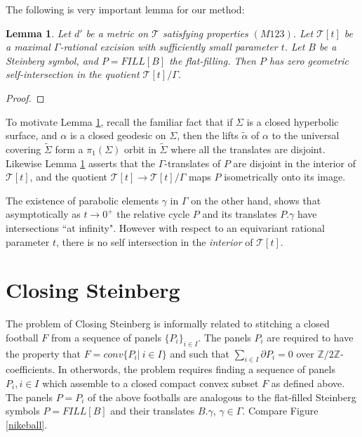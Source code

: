 \documentclass[12pt]{amsart}
\newtheorem{lem}[thm]{Lemma}
\theoremstyle{definition}
\theoremstyle{remark}
\newcommand{\bZ}{\mathbb{Z}}
\newcommand{\del}{\partial}
\newcommand{\sT}{\mathscr{T}}
\begin{document}
The following is very important lemma for our method:

\begin{lem}\label{kl}
Let $d'$ be a metric on $\sT$ satisfying properties $(M123)$. Let $\sT[t]$ be a maximal $\Gamma$-rational excision with sufficiently small parameter $t$. Let $B$ be a Steinberg symbol, and $P=FILL[B]$ the flat-filling. Then $P$ has zero geometric self-intersection in the quotient $\sT[t]/\Gamma$.
\end{lem}
\begin{proof}

\end{proof}

To motivate Lemma \ref{kl}, recall the familiar fact that if $\Sigma$ is a closed hyperbolic surface, and $\alpha$ is a closed geodesic on $\Sigma$, then the lifts $\tilde{\alpha}$ of $\alpha$ to the universal covering $\tilde{\Sigma}$ form a $\pi_1(\Sigma)$ orbit in $\tilde{\Sigma}$ where all the translates are disjoint. Likewise Lemma \ref{kl} asserts that the $\Gamma$-translates of $P$ are disjoint in the interior of $\sT[t]$, and the quotient $\sT[t] \to \sT[t]/\Gamma$ maps $P$ isometrically onto its image.

The existence of parabolic elements $\gamma$ in $\Gamma$ on the other hand, shows that asymptotically as $t\to 0^+$ the relative cycle $P$ and its translates $P.\gamma$ have intersections ``at infinity". However with respect to an equivariant rational parameter $t$, there is no self intersection in the \emph{interior} of $\sT[t]$.






\section{Closing Steinberg}\label{CS}
The problem of Closing Steinberg is informally related to stitching a closed football $F$ from a sequence of panels $\{P_i\}_{i\in I}$. The panels $P_i$ are required to have the property that $F=conv\{P_i|~i\in I\}$ and such that $\sum_{i\in I} \del P_i=0$ over $\bZ/2\bZ$-coefficients. In otherwords, the problem requires finding a sequence of panels $P_i, i\in I$ which assemble to a closed compact convex subset $F$ as defined above. The panels $P=P_i$ of the above footballs are analogous to the flat-filled Steinberg symbols $P=FILL[B]$ and their translates $B.\gamma$, $\gamma\in \Gamma$. Compare Figure \ref{nikeball}.
\end{document}
